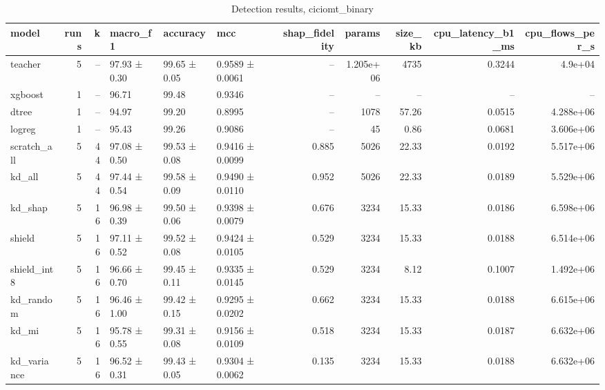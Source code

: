 \begin{table}
\caption{Detection results, ciciomt_binary}
\begin{tabular}{lrrlllrrrrr}
\toprule
model & runs & k & macro_f1 & accuracy & mcc & shap_fidelity & params & size_kb & cpu_latency_b1_ms & cpu_flows_per_s \\
\midrule
teacher & 5 & -- & 97.93 ± 0.30 & 99.65 ± 0.05 & 0.9589 ± 0.0061 & -- & 1.205e+06 & 4735 & 0.3244 & 4.9e+04 \\
xgboost & 1 & -- & 96.71 & 99.48 & 0.9346 & -- & -- & -- & -- & -- \\
dtree & 1 & -- & 94.97 & 99.20 & 0.8995 & -- & 1078 & 57.26 & 0.0515 & 4.288e+06 \\
logreg & 1 & -- & 95.43 & 99.26 & 0.9086 & -- & 45 & 0.86 & 0.0681 & 3.606e+06 \\
scratch_all & 5 & 44 & 97.08 ± 0.50 & 99.53 ± 0.08 & 0.9416 ± 0.0099 & 0.885 & 5026 & 22.33 & 0.0192 & 5.517e+06 \\
kd_all & 5 & 44 & 97.44 ± 0.54 & 99.58 ± 0.09 & 0.9490 ± 0.0110 & 0.952 & 5026 & 22.33 & 0.0189 & 5.529e+06 \\
kd_shap & 5 & 16 & 96.98 ± 0.39 & 99.50 ± 0.06 & 0.9398 ± 0.0079 & 0.676 & 3234 & 15.33 & 0.0186 & 6.598e+06 \\
shield & 5 & 16 & 97.11 ± 0.52 & 99.52 ± 0.08 & 0.9424 ± 0.0105 & 0.529 & 3234 & 15.33 & 0.0188 & 6.514e+06 \\
shield_int8 & 5 & 16 & 96.66 ± 0.70 & 99.45 ± 0.11 & 0.9335 ± 0.0145 & 0.529 & 3234 & 8.12 & 0.1007 & 1.492e+06 \\
kd_random & 5 & 16 & 96.46 ± 1.00 & 99.42 ± 0.15 & 0.9295 ± 0.0202 & 0.662 & 3234 & 15.33 & 0.0188 & 6.615e+06 \\
kd_mi & 5 & 16 & 95.78 ± 0.55 & 99.31 ± 0.08 & 0.9156 ± 0.0109 & 0.518 & 3234 & 15.33 & 0.0187 & 6.632e+06 \\
kd_variance & 5 & 16 & 96.52 ± 0.31 & 99.43 ± 0.05 & 0.9304 ± 0.0062 & 0.135 & 3234 & 15.33 & 0.0188 & 6.632e+06 \\
\bottomrule
\end{tabular}
\end{table}
